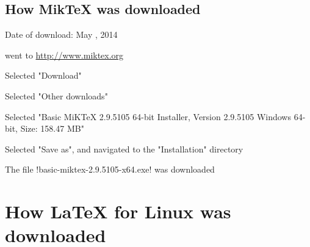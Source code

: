 \subsection{How MikTeX was downloaded}

\begin{itemize*}
\item Date of download: May , 2014
\end{itemize*}
\begin{enumerate*}
\item went to \url{http://www.miktex.org}
\item Selected "Download"
\item Selected "Other downloads"
\item Selected "Basic MiKTeX 2.9.5105 64-bit Installer, Version 2.9.5105
      Windows 64-bit, Size: 158.47 MB"
\item Selected "Save as", and navigated to the "Installation" directory
\item The file !basic-miktex-2.9.5105-x64.exe! was downloaded
\end{enumerate*}

\section{How LaTeX for Linux was downloaded}

\tbc
